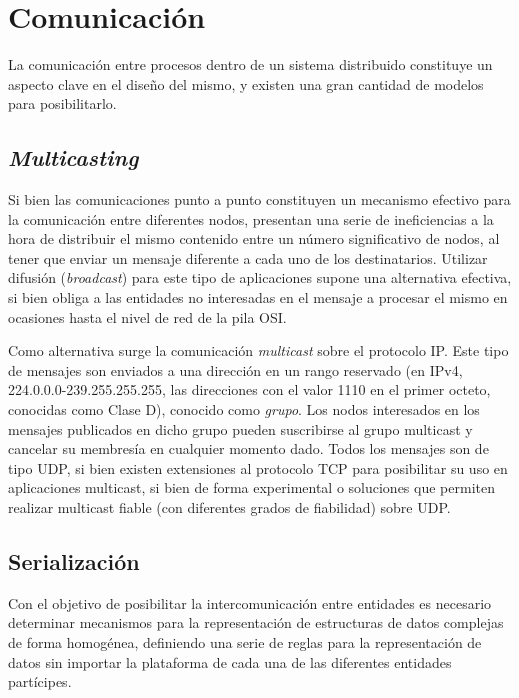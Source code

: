 \section{Comunicación}

La comunicación entre procesos dentro de un sistema distribuido constituye un aspecto clave en el diseño del mismo, y existen una gran cantidad de modelos para posibilitarlo.

\subsection{\textit{Multicasting}}

Si bien las comunicaciones punto a punto constituyen un mecanismo efectivo para la comunicación entre diferentes nodos, presentan una serie de ineficiencias a la hora de distribuir el mismo contenido entre un número significativo de nodos, al tener que enviar un mensaje diferente a cada uno de los destinatarios. Utilizar difusión (\textit{broadcast}) para este tipo de aplicaciones supone una alternativa efectiva, si bien obliga a las entidades no interesadas en el mensaje a procesar el mismo en ocasiones hasta el nivel de red de la pila OSI.

Como alternativa surge la comunicación \textit{multicast} sobre el protocolo IP. Este tipo de mensajes son enviados a una dirección en un rango reservado (en IPv4, 224.0.0.0-239.255.255.255, las direcciones con el valor 1110 en el primer octeto, conocidas como Clase D\cite{rfc791}), conocido como \textit{grupo}. Los nodos interesados en los mensajes publicados en dicho grupo pueden suscribirse al grupo multicast y cancelar su membresía en cualquier momento dado. Todos los mensajes son de tipo UDP, si bien existen extensiones al protocolo TCP para posibilitar su uso en aplicaciones multicast, si bien de forma experimental\cite{1019386, mysore2001ftp, Barcellos01efficienttcp-like, Visoottiviseth01m/tcp:the, talpadereliablemulticast} o soluciones que permiten realizar multicast fiable (con diferentes grados de fiabilidad) sobre UDP\cite{rfc2887}.

\subsection{Serialización}
\label{seralization}
Con el objetivo de posibilitar la intercomunicación entre entidades es necesario determinar mecanismos para la representación de estructuras de datos complejas de forma homogénea, definiendo una serie de reglas para la representación de datos sin importar la plataforma de cada una de las diferentes entidades partícipes.

